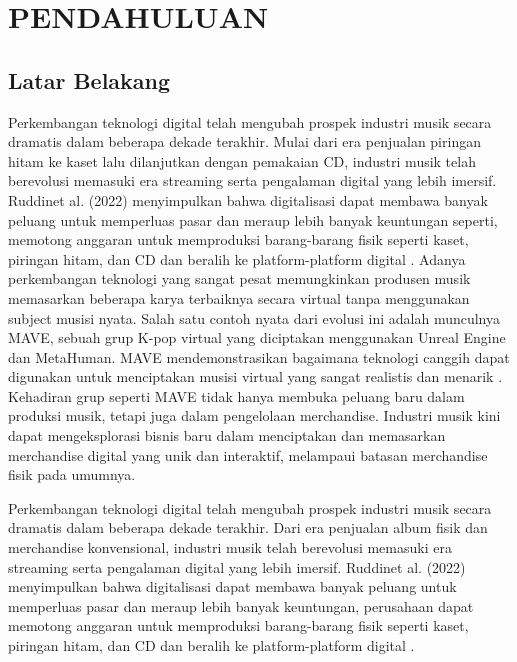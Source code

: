 \chapter{PENDAHULUAN}

\section{Latar Belakang}

Perkembangan teknologi digital telah mengubah prospek industri musik secara dramatis dalam beberapa dekade terakhir. 
Mulai dari era penjualan piringan hitam ke kaset lalu dilanjutkan dengan pemakaian CD, industri musik telah berevolusi 
memasuki era streaming serta pengalaman digital yang lebih imersif. Ruddinet al. (2022) menyimpulkan bahwa digitalisasi 
dapat membawa banyak peluang untuk memperluas pasar dan meraup lebih banyak keuntungan seperti, memotong anggaran untuk 
memproduksi barang-barang fisik seperti kaset, piringan hitam, dan CD dan beralih ke platform-platform digital \parencite{Ruddin2022}. Adanya
perkembangan teknologi yang sangat pesat memungkinkan produsen musik memasarkan beberapa karya terbaiknya secara virtual
tanpa menggunakan subject musisi nyata. Salah satu contoh nyata dari evolusi ini adalah munculnya MAVE, sebuah grup K-pop
virtual yang diciptakan menggunakan Unreal Engine dan MetaHuman. MAVE mendemonstrasikan bagaimana teknologi canggih dapat
digunakan untuk menciptakan musisi virtual yang sangat realistis dan menarik \parencite{EpicGames2023}. Kehadiran grup seperti MAVE tidak hanya
membuka peluang baru dalam produksi musik, tetapi juga dalam pengelolaan merchandise. Industri musik kini dapat 
mengeksplorasi bisnis baru dalam menciptakan dan memasarkan merchandise digital yang unik dan interaktif, melampaui 
batasan merchandise fisik pada umumnya.


Perkembangan teknologi digital telah mengubah prospek industri musik secara dramatis dalam beberapa dekade terakhir. 
Dari era penjualan album fisik dan merchandise konvensional, industri musik telah berevolusi memasuki era streaming 
serta pengalaman digital yang lebih imersif. Ruddinet al. (2022) menyimpulkan bahwa digitalisasi dapat membawa banyak
peluang untuk memperluas pasar dan meraup lebih banyak keuntungan, perusahaan dapat memotong anggaran untuk memproduksi
barang-barang fisik seperti kaset, piringan hitam, dan CD dan beralih ke platform-platform digital \parencite{Ruddin2022}.
\\

